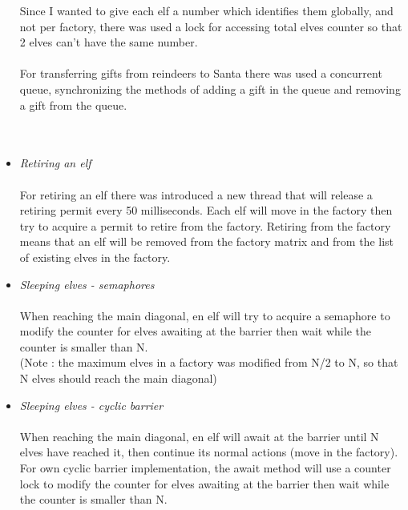 \documentclass{article}
\begin{document}
\begin{itemize}
        Since I wanted to give each elf a number which identifies them globally, and not per factory, there was used a lock for accessing total elves counter so that 2 elves can't have the same number.
        \\
        \\
        For transferring gifts from reindeers to Santa there was used a concurrent queue, synchronizing the methods of adding a gift in the queue and removing a gift from the queue.
        \\
        \\
        \\
        \item \textit{Retiring an elf}\\
        \\
        For retiring an elf there was introduced a new thread that will release a retiring permit every 50 milliseconds. Each elf will move in the factory then try to acquire a permit to retire from the factory. Retiring from the factory means that an elf will be removed from the factory matrix and from the list of existing elves in the factory.\\
        \item \textit{Sleeping elves - semaphores}\\
        \\
        When reaching the main diagonal, en elf will try to acquire a semaphore to modify the counter for elves awaiting at the barrier then wait while the counter is smaller than N.\\
        (Note : the maximum elves in a factory was modified from N/2 to N, so that N elves should reach the main diagonal)
        \item \textit{Sleeping elves - cyclic barrier}
        \\
        \\
        When reaching the main diagonal, en elf will await at the barrier until N elves have reached it, then continue its normal actions (move in the factory).
        \\
        For own cyclic barrier implementation, the await method will use a counter lock to modify the counter for elves awaiting at the barrier then wait while the counter is smaller than N.
        
        
    \end{itemize}

    
    
\end{document}
